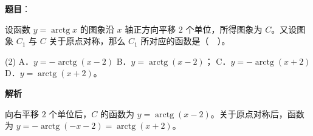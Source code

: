 \begin{answer}

\textbf{题目}：

设函数 $y=\operatorname{arctg}x$ 的图象沿 $x$ 轴正方向平移 $2$ 个单位，所得图象为 $C$。又设图象 $C_1$ 与 $C$ 关于原点对称，那么 $C_1$ 所对应的函数是（　）。

\begin{gkopts}(2)
\task A．$y=-\operatorname{arctg}(x-2)$
\task B．$y=\operatorname{arctg}(x-2)$；
\task C．$y=-\operatorname{arctg}(x+2)$
\task D．$y=\operatorname{arctg}(x+2)$。
\end{gkopts}

\textbf{解析}

向右平移 $2$ 个单位后，$C$ 的函数为 $y=\operatorname{arctg}(x-2)$。关于原点对称后，函数为 $y=-\operatorname{arctg}(-x-2)=\operatorname{arctg}(x+2)$。


\end{answer}
